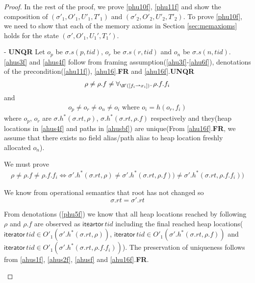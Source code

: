 \begin{proof}
In the rest of the proof, we prove \ref{phu10f}, \ref{phu11f} and show the composition of $(\sigma'_1, O'_1, U'_1,T'_1)$ and  $(\sigma'_2, O'_2, U'_2,T'_2)$. To prove \ref{phu10f}, we need to show that each of the memory axioms in Section \ref{sec:memaxioms} holds for the state $(\sigma',O'_1,U_1',T_1')$.

\begin{case}\label{unqrf} - \textbf{UNQR} 
Let $o_p$ be $\sigma.s(p,tid)$, $o_r$ be $\sigma.s(r,tid)$ and $o_n$ be $\sigma.s(n,tid)$. 
  \ref{ahus3f} and \ref{ahus4f} follow from framing assumption(\ref{ahu3f}-\ref{ahu6f}), denotations of the precondition(\ref{ahu11f}), \ref{ahu16}.\textbf{FR} and \ref{ahu16f}.\textbf{UNQR}
  \begin{gather}\label{ahusbf}
    \rho \neq \rho.f \neq \forall_{\N'([f_i \rightharpoonup x_i])}\ldotp \rho.f.f_i
  \end{gather}
and   
  \begin{gather}\label{ahus4f}
    o_p \neq o_r \neq o_n \neq o_i \text{  where  } o_i=h(o_r,f_i)
  \end{gather}
where $o_p$,  $o_r$ are  $\sigma.h^{*}(\sigma.rt,\rho)$, $\sigma.h^{*}(\sigma.rt,\rho.f)$ respectively and they(heap locations in \ref{ahus4f} and paths in \ref{ahusbf}) are unique(From \ref{ahu16f}.\textbf{FR}, we assume that there exists no field alias/path alias to heap location freshly allocated $o_n$). 

We must prove 
\begin{gather}\label{phuc1f}
    \rho \neq \rho.f \neq \rho.f.f_i \iff \sigma'.h^{*}(\sigma.rt,\rho) \neq \sigma'.h^{*}(\sigma.rt, \rho.f) )  \neq \sigma'.h^{*}(\sigma.rt, \rho.f.f_i) )
\end{gather}

We know from operational semantics that root has not changed so
\[\sigma.rt = \sigma'.rt\]

From denotations (\ref{phu5f}) we know that all heap locations reached by following $\rho$ and $\rho.f$ are observed as $\textsf{iteartor}\,tid$ including the final reached heap locations($\textsf{iterator}\,tid \in O'_1(\sigma'.h^{*}(\sigma.rt,\rho))$, $\textsf{iterator}\,tid \in O'_1(\sigma'.h^{*}(\sigma.rt,\rho.f))$ and $\textsf{iterator}\,tid \in O'_1(\sigma'.h^{*}(\sigma.rt,\rho.f.f_i))$). The preservation of uniqueness follows from \ref{ahus1f}, \ref{ahus2f}, \ref{ahusf} and \ref{ahu16f}.\textbf{FR}.


\end{case}
\end{proof}
